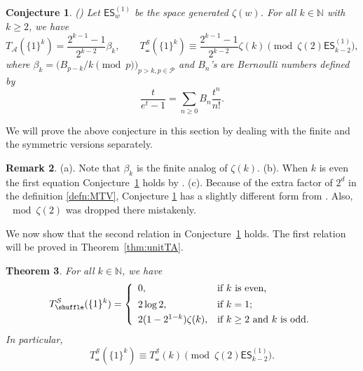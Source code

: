 \documentclass{article}
\newcommand{\ES}{\mathsf {ES}}
\newcommand{\sha}{\shuffle}
\newcommand{\Sy}{{\mathcal S}}
\newcommand{\calA}{\mathcal{A}}
\newcommand{\calP}{\mathcal{P}}
\newcommand{\N}{\mathbb{N}}
\theoremstyle{plain}
\newtheorem{thm}{Theorem}[section]
\newtheorem{conj}[thm]{Conjecture}
\theoremstyle{definition}
\newtheorem{rem}[thm]{Remark}
\begin{document}
\begin{conj}\label{conj:unitT} \emph{(\cite[Conj. 5]{Zhao2023Dec})}
Let $\ES_{w}^{(1)}$ be the space generated $\zeta(w)$. For all $k\in\N$ with $k\ge 2$, we have
\begin{equation*}
  T_\calA(\{1\}^k)=\frac{2^{k-1}-1}{2^{k-2}} \beta_k, \qquad
  T_\sha^\Sy(\{1\}^k)\equiv \frac{2^{k-1}-1}{2^{k-2}} \zeta(k) \pmod{\zeta(2)\ES_{k-2}^{(1)}},
\end{equation*}
where $\beta_k=\big(B_{p-k}/k \pmod{p}\big)_{p>k,p\in \calP}$ and $B_n$'s are Bernoulli numbers defined by
\begin{equation*}
    \frac{t}{e^t-1}=\sum_{n\ge 0} B_n \frac{t^n}{n!}.
\end{equation*}
\end{conj}
We will prove the above conjecture in this section by dealing with the finite and the symmetric versions separately.

\begin{rem} (a). Note that $\beta_k$ is the finite analog of $\zeta(k)$.
(b). When $k$ is even the first equation Conjecture~\ref{conj:unitT} holds by \cite[Prop. 7]{Zhao2023Dec}.
(c). Because of the extra factor of $2^d$ in the definition \eqref{defn:MTV}, Conjecture \ref{conj:unitT} has a slightly different form
from \cite[Conj. 5]{Zhao2023Dec}. Also, $\mod \zeta(2)$ was dropped there mistakenly.
\end{rem}

We now show that the second relation in Conjecture~\ref{conj:unitT} holds. The first relation will be proved in Theorem~\ref{thm:unitTA}.

\begin{thm}\label{thm:unitSMT}
For all $k\in\N$, we have
\begin{equation*}
  T_\sha^\Sy(\{1\}^k)=
\left\{
  \begin{array}{ll}
    0, & \hbox{if $k$ is even,}\\
    2\log 2, \phantom{ \displaystyle \frac12} & \hbox{if $k=1$;} \\
    2(1-2^{1-k}) \zeta(k), & \hbox{if $k\ge 2$ and $k$ is odd.}
  \end{array}
\right.
\end{equation*}
In particular,
\begin{equation} \label{equ:T111=dual}
  T_\sha^\Sy(\{1\}^k)\equiv T_\sha^\Sy(k)  \pmod{\zeta(2)\ES_{k-2}^{(1)}}.
\end{equation}
\end{thm}
\end{document}
